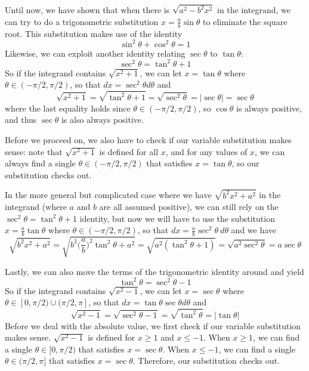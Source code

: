     Until now, we have shown that when there is $\sqrt{a^2-b^2x^2}$ in the integrand, we can try to do a trigonometric substitution $x = \frac{a}{b}\sin \theta$ to eliminate the square root.  This substitution makes use of the identity
    \[\sin^2\theta + \cos^2\theta = 1\]
    Likewise, we can exploit another identity relating $\sec \theta$ to $\tan \theta$:
    \[\sec^2\theta = \tan^2\theta + 1\]
    So if the integrand contains $\sqrt{x^2 + 1}$, we can let $x = \tan \theta$ where $\theta \in (-\pi/2, \pi/2)$, so that $dx = \sec^2 \theta d\theta$ and
    \[\sqrt{x^2 + 1} = \sqrt{\tan^2\theta + 1} = \sqrt{\sec^2 \theta} = |\sec \theta| = \sec \theta\]
    where the last equality holds since $\theta \in (-\pi/2, \pi/2)$, so $\cos \theta$ is always positive, and thus $\sec \theta$ is also always positive. 
    
    Before we proceed on, we also have to check if our variable substitution makes sense: note that $\sqrt{x^2 + 1}$ is defined for all $x$, and for any values of $x$, we can always find a single $\theta \in (-\pi/2, \pi/2)$ that satisfies $x = \tan \theta$, so our substitution checks out.

    In the more general but complicated case where we have $\sqrt{b^2x^2 + a^2}$ in the integrand (where $a$ and $b$ are all assumed positive), we can still rely on the $\sec^2\theta = \tan^2\theta + 1$ identity, but now we will have to use the substitution $x = \frac{a}{b}\tan \theta$ where $\theta \in (-\pi/2, \pi/2)$, so that $dx = \frac{a}{b}\sec^2\theta~d\theta$ and we have
    \[\sqrt{b^2x^2+a^2} = \sqrt{b^2\Big(\frac{a}{b}\Big)^2\tan^2 \theta + a^2} = \sqrt{a^2 (\tan^2 \theta + 1)} = \sqrt{a^2\sec^2\theta} = a\sec\theta\]

    Lastly, we can also move the terms of the trigonometric identity around and yield
    \[\tan^2\theta = \sec^2\theta - 1\]
    So if the integrand contains $\sqrt{x^2 - 1}$, we can let $x = \sec \theta$ where $\theta \in [0, \pi/2) \cup (\pi/2, \pi]$, so that $dx = \tan \theta \sec \theta d\theta$ and
    \[\sqrt{x^2 - 1} = \sqrt{\sec^2\theta - 1} = \sqrt{\tan^2 \theta} = |\tan \theta|\]
    Before we deal with the absolute value, we first check if our variable substitution makes sense. $\sqrt{x^2 -1}$ is defined for $x \ge 1$ and $x \le -1$.  When $x \ge 1$, we can find a single $\theta \in [0, \pi/2)$ that satisfies $x = \sec \theta$.  When $x \le -1$, we can find a single $\theta \in (\pi/2, \pi]$ that satisfies $x = \sec \theta$. Therefore, our substitution checks out.
    
